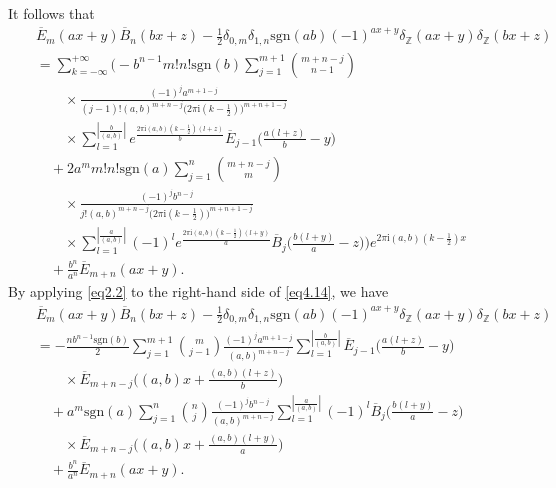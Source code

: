 \documentclass[reqno]{amsart}
\numberwithin{equation}{section}
\begin{document}
It follows that
\begin{eqnarray}\label{eq4.14}
&&\overline{E}_{m}(ax+y)\overline{B}_{n}(bx+z)-\frac{1}{2}\delta_{0,m}\delta_{1,n}\mathrm{sgn}(ab)(-1)^{ax+y}\delta_{\mathbb{Z}}(ax+y)\delta_{\mathbb{Z}}(bx+z)\nonumber\\
&&=\sum_{k=-\infty}^{+\infty}\biggl(-b^{n-1}m!n!\mathrm{sgn}(b)\sum_{j=1}^{m+1}
\binom{m+n-j}{n-1}\nonumber\\
&&\qquad\times\frac{(-1)^{j}a^{m+1-j}}{(j-1)!(a,b)^{m+n-j}\bigl(2\pi\mathrm{i}(k-\frac{1}{2})\bigl)^{m+n+1-j}}\nonumber\\
&&\qquad\times\sum_{l=1}^{|\frac{b}{(a,b)}|}e^{\frac{2\pi\mathrm{i}(a,b)(k-\frac{1}{2})(l+z)}{b}}
\overline{E}_{j-1}\biggl(\frac{a(l+z)}{b}-y\biggl)\nonumber\\
&&\quad+2a^{m}m!n!\mathrm{sgn}(a)\sum_{j=1}^{n}\binom{m+n-j}{m}\nonumber\\
&&\qquad\times\frac{(-1)^{j}b^{n-j}}{j!(a,b)^{m+n-j}\bigl(2\pi\mathrm{i}(k-\frac{1}{2})\bigl)^{m+n+1-j}}\nonumber\\
&&\qquad\times\sum_{l=1}^{|\frac{a}{(a,b)}|}(-1)^{l}e^{\frac{2\pi\mathrm{i}(a,b)(k-\frac{1}{2})(l+y)}{a}}
\overline{B}_{j}\biggl(\frac{b(l+y)}{a}-z\biggl)\biggl)e^{2\pi\mathrm{i}(a,b)(k-\frac{1}{2})x}\nonumber\\
&&\quad+\frac{b^{n}}{a^{n}}\overline{E}_{m+n}(ax+y).
\end{eqnarray}
By applying \eqref{eq2.2} to the right-hand side of \eqref{eq4.14}, we have
\begin{eqnarray}\label{eq4.15}
&&\overline{E}_{m}(ax+y)\overline{B}_{n}(bx+z)-\frac{1}{2}\delta_{0,m}\delta_{1,n}\mathrm{sgn}(ab)(-1)^{ax+y}\delta_{\mathbb{Z}}(ax+y)\delta_{\mathbb{Z}}(bx+z)\nonumber\\
&&=-\frac{nb^{n-1}\mathrm{sgn}(b)}{2}\sum_{j=1}^{m+1}
\binom{m}{j-1}\frac{(-1)^{j}a^{m+1-j}}{(a,b)^{m+n-j}}\sum_{l=1}^{|\frac{b}{(a,b)}|}\overline{E}_{j-1}\biggl(\frac{a(l+z)}{b}-y\biggl)\nonumber\\
&&\qquad\times\overline{E}_{m+n-j}\biggl((a,b)x+\frac{(a,b)(l+z)}{b}\biggl)\nonumber\\
&&\quad+a^{m}\mathrm{sgn}(a)\sum_{j=1}^{n}\binom{n}{j}\frac{(-1)^{j}b^{n-j}}{(a,b)^{m+n-j}}\sum_{l=1}^{|\frac{a}{(a,b)}|}(-1)^{l}
\overline{B}_{j}\biggl(\frac{b(l+y)}{a}-z\biggl)\nonumber\\
&&\qquad\times\overline{E}_{m+n-j}\biggl((a,b)x+\frac{(a,b)(l+y)}{a}\biggl)\nonumber\\
&&\quad+\frac{b^{n}}{a^{n}}\overline{E}_{m+n}(ax+y).
\end{eqnarray}
\end{document}
